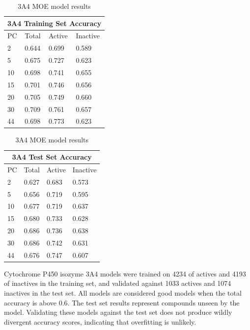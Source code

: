 \begin{table}[!htbp]
\begin{minipage}{.5\linewidth}
\centering
\begin{tabular}{|l|l|l|l|}
\hline
\multicolumn{4}{|c|}{3A4 Training Set Accuracy} \\ \hline
PC & Total          & Active          & Inactive \\ \hline
2  & 0.644          & 0.699           & 0.589   \\ \hline
5  & 0.675          & 0.727           & 0.623   \\ \hline
10 & 0.698          & 0.741           & 0.655   \\ \hline
15 & 0.701          & 0.746           & 0.656   \\ \hline
20 & 0.705          & 0.749           & 0.660   \\ \hline
30 & 0.709          & 0.761           & 0.657   \\ \hline
44 & 0.698          & 0.773           & 0.623   \\ \hline
\end{tabular}
\end{minipage}
\begin{minipage}{.5\linewidth}
\centering
\begin{tabular}{|l|l|l|l|}
\hline
\multicolumn{4}{|c|}{3A4 Test Set Accuracy}      \\ \hline
PC & Total          & Active          & Inactive \\ \hline
2  & 0.627          & 0.683           & 0.573    \\ \hline
5  & 0.656          & 0.719           & 0.595    \\ \hline
10 & 0.677          & 0.719           & 0.637    \\ \hline
15 & 0.680          & 0.733           & 0.628    \\ \hline
20 & 0.686          & 0.736           & 0.638    \\ \hline
30 & 0.686          & 0.742           & 0.631    \\ \hline
44 & 0.676          & 0.747           & 0.607    \\ \hline
\end{tabular}
\end{minipage}
\caption{3A4 MOE model results}
\end{table}

Cytochrome P450 isozyme 3A4 models were trained on 4234 of actives and 4193 of inactives in the training set, and validated against 1033 actives and 1074 inactives in the test set. All models are considered good models when the total accuracy is above 0.6. The test set results represent compounds unseen by the model. Validating these models against the test set does not produce wildly divergent accuracy scores, indicating that overfitting is unlikely.

